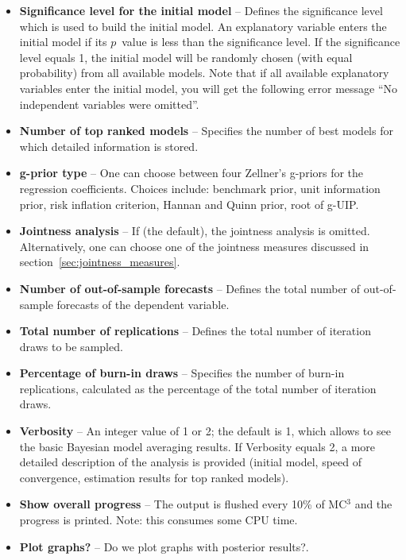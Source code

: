 \begin{itemize}
		Note that for the binomial model prior and with $\E(\Xi)=0.5K$ one
		can define the uniform prior on the model space. For example, for
		$K=10$ regressors we can define the uniform prior with
		$\E(\Xi)=5$. For $\E(\Xi) < 5$ we assign high probability to small
		models.  The smaller the prior expected model size $\E(\Xi)$, the
		less probable are larger models.
	\item \textbf{Significance level for the initial model} -- Defines the
		significance level which is used to build the initial model. An
		explanatory variable enters the initial model if its $p$~value is
		less than the significance level. If the significance level equals
		1, the initial model will be randomly chosen (with equal
		probability) from all available models. Note that if all available
		explanatory variables enter the initial model, you will get the
		following  error message ``No independent variables were
		omitted''.
	\item \textbf{Number of top ranked models} -- Specifies the number of
		best models for which detailed information is stored.
	\item \textbf{g-prior type} -- One can choose between four Zellner's
		g-priors for the regression coefficients. Choices include: benchmark
		prior, unit information prior, risk inflation criterion, Hannan and
		Quinn prior, root of g-UIP.
	\item \textbf{Jointness analysis} -- If  (the default),
		the jointness analysis is omitted. Alternatively, one can choose
		one of the jointness measures discussed in section~\ref{sec:jointness_measures}.
	\item \textbf{Number of out-of-sample forecasts} -- Defines the total
		number of out-of-sample forecasts of the dependent variable.
	\item \textbf{Total number of replications} -- Defines the total
		number of iteration draws to be sampled.
	\item \textbf{Percentage of burn-in draws} -- Specifies the number of
		burn-in replications, calculated as the percentage of the total
		number of iteration draws.
	\item \textbf{Verbosity} -- An integer value of 1 or 2; the default is
		1, which allows to see the basic Bayesian model averaging
		results. If Verbosity equals 2, a more detailed description of the
		analysis is provided (initial model, speed of convergence,
		estimation results for top ranked models).
	\item \textbf{Show overall progress} -- The output is flushed every 10\%
		of MC$^3$ and the progress is printed. Note: this consumes some CPU time.
	\item \textbf{Plot graphs?} -- Do we plot graphs with posterior results?.
\end{itemize}     

